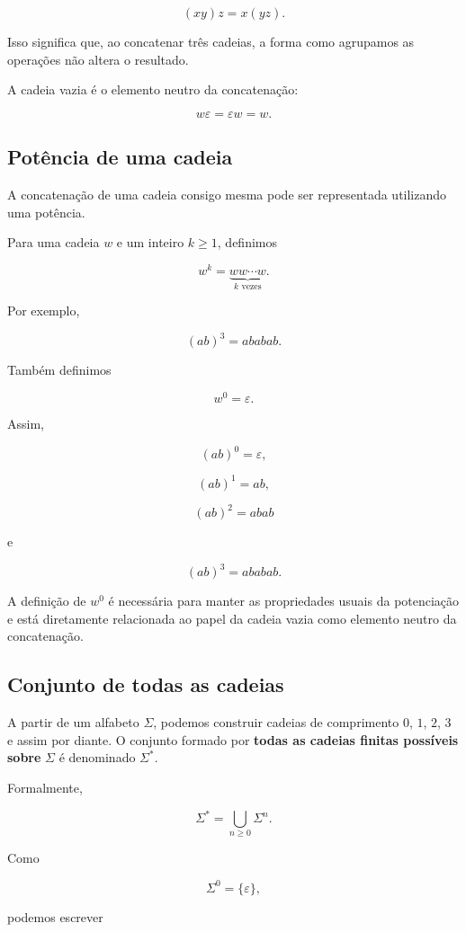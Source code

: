 \documentclass[
  brazilian,
  letterpaper,
]{book}
\theoremstyle{plain}
\theoremstyle{definition}
\theoremstyle{remark}
\begin{document}
\[
(xy)z=x(yz).
\]

Isso significa que, ao concatenar três cadeias, a forma como agrupamos
as operações não altera o resultado.

A cadeia vazia é o elemento neutro da concatenação:

\[
w\varepsilon=\varepsilon w=w.
\]

\subsection{Potência de uma cadeia}\label{potuxeancia-de-uma-cadeia}

A concatenação de uma cadeia consigo mesma pode ser representada
utilizando uma potência.

Para uma cadeia \(w\) e um inteiro \(k\geq 1\), definimos

\[
w^k=
\underbrace{ww\cdots w}_{k\text{ vezes}}.
\]

Por exemplo,

\[
(ab)^3=ababab.
\]

Também definimos

\[
w^0=\varepsilon.
\]

Assim,

\[
(ab)^0=\varepsilon,
\]

\[
(ab)^1=ab,
\]

\[
(ab)^2=abab
\]

e

\[
(ab)^3=ababab.
\]

A definição de \(w^0\) é necessária para manter as propriedades usuais
da potenciação e está diretamente relacionada ao papel da cadeia vazia
como elemento neutro da concatenação.

\subsection{Conjunto de todas as
cadeias}\label{conjunto-de-todas-as-cadeias}

A partir de um alfabeto \(\Sigma\), podemos construir cadeias de
comprimento \(0\), \(1\), \(2\), \(3\) e assim por diante. O conjunto
formado por \textbf{todas as cadeias finitas possíveis sobre} \(\Sigma\)
é denominado \(\Sigma^*\).

Formalmente,

\[
\Sigma^*=
\bigcup_{n\geq0}\Sigma^n.
\]

Como

\[
\Sigma^0=\{\varepsilon\},
\]

podemos escrever
\end{document}
